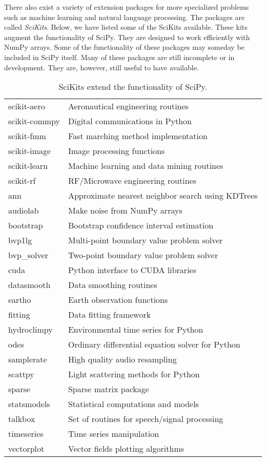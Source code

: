 There also exist a variety of extension packages for more specialized problems such as machine learning and natural language processing.  The packages are called \emph{SciKits}.  Below, we have listed some of the SciKits available.  These kits augment the functionality of SciPy.  They are designed to work efficiently with NumPy arrays.  Some of the functionality of these packages may someday be included in SciPy itself.  Many of these packages are still incomplete or in development.  They are, however, still useful to have available.
\begin{table}[h]
\centering
\begin{tabular}{|l|l|}
\hline
scikit-aero & Aeronautical engineering routines \\
scikit-commpy & Digital communications in Python \\
scikit-fmm & Fast marching method implementation \\
scikit-image & Image processing functions \\
scikit-learn & Machine learning and data mining routines \\
scikit-rf & RF/Microwave engineering routines \\
ann & Approximate nearest neighbor search using KDTrees \\
audiolab & Make noise from NumPy arrays \\
bootstrap & Bootstrap confidence interval estimation \\
bvp1lg & Multi-point boundary value problem solver \\
bvp\_solver & Two-point boundary value problem solver \\
cuda & Python interface to CUDA libraries \\
datasmooth & Data smoothing routines \\
eartho & Earth observation functions \\
fitting & Data fitting framework \\
hydroclimpy & Environmental time series for Python \\
odes & Ordinary differential equation solver for Python \\
samplerate & High quality audio resampling \\
scattpy & Light scattering methods for Python \\
sparse & Sparse matrix package \\
statsmodels & Statistical computations and models \\
talkbox & Set of routines for speech/signal processing \\
timeseries & Time series manipulation \\
vectorplot & Vector fields plotting algorithms \\
\hline
\end{tabular}
\caption{SciKits extend the functionality of SciPy.}
\end{table}
